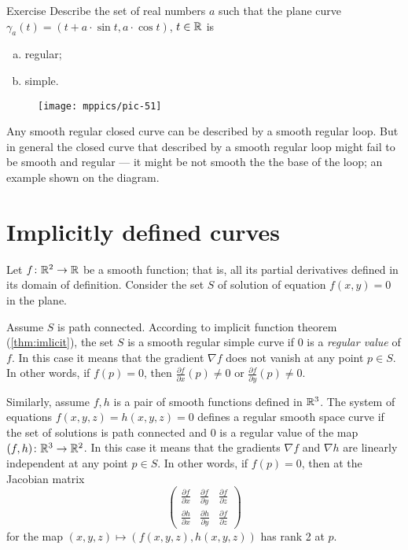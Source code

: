\begin{thm}{Exercise}\label{ex:cycloid}
Describe the set of real numbers $a$
such that the plane curve $\gamma_a(t)= (t+a\cdot \sin t,a\cdot \cos t)$, $t\in\mathbb{R}$ is
\begin{enumerate}[(a)]
\item regular;
\item simple.
\end{enumerate}

\end{thm}

\begin{wrapfigure}{r}{17 mm}
\vskip-5mm
\centering
\texttt{[image: mppics/pic-51]}
\end{wrapfigure}

Any smooth regular closed curve can be described by a smooth regular loop.
But in general the closed curve that described by a smooth regular loop might fail to be smooth and regular --- it might be not smooth the the base of the loop; an example shown on the diagram.


\section*{Implicitly defined curves}

Let $f\colon\mathbb{R}^2\to \mathbb{R}$ be a smooth function; 
that is, all its partial derivatives defined in its domain of definition.
Consider the set $S$ of solution of equation $f(x,y)=0$ in the plane.

Assume $S$ is path connected.
According to implicit function theorem (\ref{thm:imlicit}), the set $S$ is a smooth regular simple curve if $0$ is a \emph{regular value} of $f$.
In this case it means that the gradient $\nabla f$ does not vanish at any point $p\in S$.
In other words, if $f(p)=0$, then  $\tfrac{\partial f}{\partial x}(p)\ne 0$ or $\tfrac{\partial f}{\partial y}(p)\ne 0$.

Similarly, assume $f,h$ is a pair of smooth functions defined in $\mathbb{R}^3$.
The system of equations
$f(x,y,z)=h(x,y,z)=0$
defines a regular smooth space curve if the set of solutions is path connected and $0$ is a regular value of the map $(f,h)\colon\mathbb{R}^3\to\mathbb{R}^2$.
In this case it means that the gradients $\nabla f$ and $\nabla h$ are linearly independent at any point $p\in S$.
In other words, if $f(p)=0$, then at the Jacobian matrix
\[
\begin{pmatrix}
\tfrac{\partial f}{\partial x}&\tfrac{\partial f}{\partial y}&\tfrac{\partial f}{\partial z}\\
\tfrac{\partial h}{\partial x}&\tfrac{\partial h}{\partial y}&\tfrac{\partial f}{\partial z}
\end{pmatrix}
\]
for the map $(x,y,z)\mapsto (f(x,y,z),h(x,y,z))$ has rank 2 at $p$.


